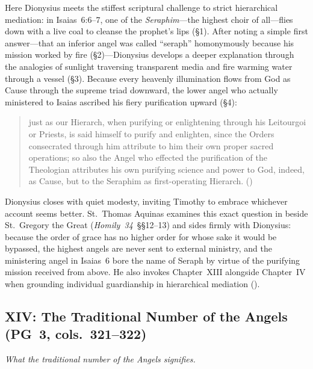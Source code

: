 Here Dionysius meets the stiffest scriptural challenge to strict hierarchical mediation: in Isaias~6:6--7, one of the \emph{Seraphim}---the highest choir of all---flies down with a live coal to cleanse the prophet's lips (\S 1). After noting a simple first answer---that an inferior angel was called ``seraph'' homonymously because his mission worked by fire (\S 2)---Dionysius develops a deeper explanation through the analogies of sunlight traversing transparent media and fire warming water through a vessel (\S 3). Because every heavenly illumination flows from God as Cause through the supreme triad downward, the lower angel who actually ministered to Isaias ascribed his fiery purification upward (\S 4):
\begin{quotation}
just as our Hierarch, when purifying or enlightening through his Leitourgoi or Priests, is said himself to purify and enlighten, since the Orders consecrated through him attribute to him their own proper sacred operations; so also the Angel who effected the purification of the Theologian attributes his own purifying science and power to God, indeed, as Cause, but to the Seraphim as first-operating Hierarch. ()
\end{quotation}
Dionysius closes with quiet modesty, inviting Timothy to embrace whichever account seems better. St.~Thomas Aquinas examines this exact question in  beside St.~Gregory the Great (\emph{Homily~34}~\S\S 12--13) and sides firmly with Dionysius: because the order of grace has no higher order for whose sake it would be bypassed, the highest angels are never sent to external ministry, and the ministering angel in Isaias~6 bore the name of Seraph by virtue of the purifying mission received from above. He also invokes Chapter~XIII alongside Chapter~IV when grounding individual guardianship in hierarchical mediation ().

\subsection{XIV: The Traditional Number of the Angels (PG~3, cols.~321--322)}
\label{sec:ch-xiv}
\emph{What the traditional number of the Angels signifies.}

